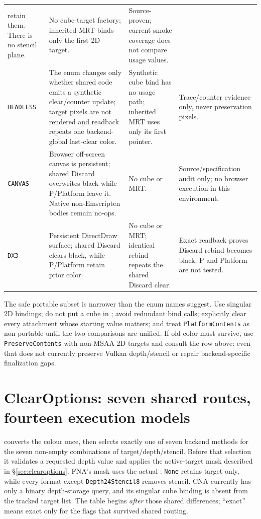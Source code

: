 \begin{longtable}{@{}p{}p{}p{}p{}@{}}
    retain them. There is no stencil plane.
  & No cube-target factory; inherited MRT binds only the first 2D target.
  & Source-proven; current smoke coverage does not compare usage values. \\
\texttt{HEADLESS}
  & The enum changes only whether shared code emits a synthetic clear/counter update;
    target pixels are not rendered and readback repeats one backend-global last-clear color.
  & Synthetic cube bind has no usage path; inherited MRT uses only its first pointer.
  & Trace/counter evidence only, never preservation pixels. \\
\texttt{CANVAS}
  & Browser off-screen canvas is persistent; shared Discard overwrites black while P/Platform
    leave it. Native non-Emscripten bodies remain no-ops.
  & No cube or MRT.
  & Source/specification audit only; no browser execution in this environment. \\
\texttt{DX3}
  & Persistent DirectDraw surface; shared Discard clears black, while P/Platform retain
    prior color.
  & No cube or MRT; identical rebind repeats the shared Discard clear.
  & Exact readback proves Discard rebind becomes black; P and Platform are not tested. \\
\bottomrule
\end{longtable}
\endgroup

The safe portable subset is narrower than the enum names suggest. Use singular 2D bindings;
do not put a cube in ; avoid redundant bind calls; explicitly
clear every attachment whose starting value matters; and treat \texttt{PlatformContents} as
non-portable until the two comparisons are unified. If old color must survive, use
\texttt{PreserveContents} with non-MSAA 2D targets and consult the row above: even that does
not currently preserve Vulkan depth/stencil or repair backend-specific finalization gaps.

\section{ClearOptions: seven shared routes, fourteen execution models}
\label{sec:backend-clear-matrix}

 converts the colour once, then selects exactly one of seven backend
methods for the seven non-empty combinations of target/depth/stencil. Before that selection it
validates a requested depth value and applies the active-target mask described in
\S\ref{sec:clearoptions}. FNA's mask uses the actual : \texttt{None}
retains target only, while every format except \texttt{Depth24Stencil8} removes stencil. CNA
currently has only a binary depth-storage query, and its singular cube binding is absent from
the tracked target list. The table begins \emph{after} those shared differences; ``exact'' means
exact only for the flags that survived shared routing.

